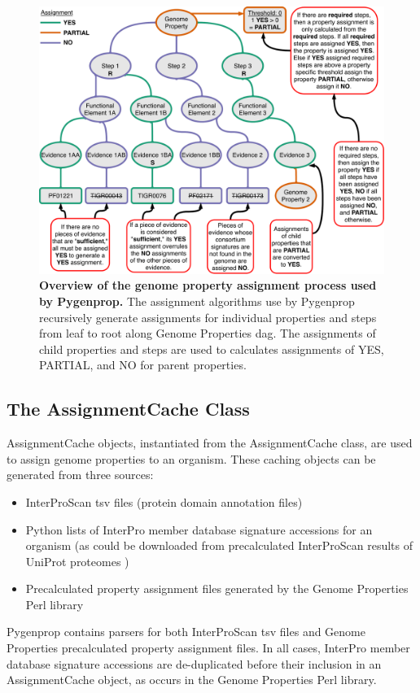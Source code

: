 \begin{figure}[!ht]
  \centering
	\includegraphics[width=\textwidth]{media/Pygenprop_Assignment.pdf}
	 \caption[Overview of the genome property assignment process used by 
Pygenprop.]{\textbf{Overview of the genome property assignment process used by 
Pygenprop.} The assignment algorithms use by Pygenprop recursively generate 
assignments for individual properties and steps from leaf to root along Genome 
Properties \gls{dag}. The assignments of child properties and steps are used to 
calculates assignments of YES, PARTIAL, and NO for parent properties.}
	 \label{fig:propertyassignment}
\end{figure}

\subsection{The AssignmentCache Class} \label{AssignmentCache}

AssignmentCache objects, instantiated from the AssignmentCache class, are used 
to assign genome properties to an organism. These caching objects can be 
generated from three sources: 

\FloatBarrier
\begin{itemize}
\item InterProScan \gls{tsv} files (protein domain annotation files) 
\item Python lists of InterPro member database signature accessions for an 
organism (as could be downloaded from precalculated InterProScan results of 
UniProt proteomes \cite{uniprot2014uniprot})
\item Precalculated property assignment files generated by the Genome Properties 
Perl library
\end{itemize}
Pygenprop contains parsers for both InterProScan \gls{tsv} files and Genome 
Properties precalculated property assignment files. In all cases, InterPro 
member database signature accessions are de-duplicated before their inclusion in 
an AssignmentCache object, as occurs in the Genome Properties Perl library.

